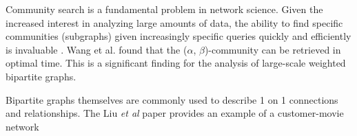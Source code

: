 Community search is a fundamental problem in network science. Given the increased interest in analyzing large amounts of data, the ability to find specific communities (subgraphs) given increasingly specific queries quickly and efficiently is invaluable \cite{Fang2019survey}. Wang et al. \cite{WangZhang20} found that the ($\alpha$, $\beta$)-community can be retrieved in optimal time. This is a significant finding for the analysis of large-scale weighted bipartite graphs.

Bipartite graphs themselves are commonly used to describe 1 on 1 connections and relationships. The Liu \textit{et al} paper provides an example of a customer-movie network 



